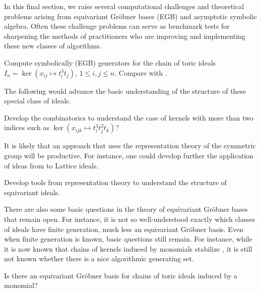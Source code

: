 
In this final section, we raise several computational challenges and theoretical problems arising from equivariant Gr\"obner bases (EGB) and asymptotic symbolic algebra.  Often these challenge problems can serve as benchmark tests for sharpening the methods of practitioners who are improving and implementing these new classes of algorithms.

\begin{problem}
Compute symbolically (EGB) generators for the chain of toric ideals $I_n = \ker(x_{ij} \mapsto t_i^3 t_j)$, $1 \leq i,j \leq n$.  Compare with \cite{Hillar13, hillar2016corrigendum, KKL:equivariant-markov, draisma2013noetherianity}.
\end{problem}

%

The following would advance the basic understanding of the structure of these special class of ideals.

\begin{problem}
Develop the combinatorics to understand the case of kernels with more than two indices such as $\ker(x_{ijk} \mapsto t_i^3 t_j^2 t_k)$?  
\end{problem}

It is likely that an approach that uses the representation theory of the symmetric group will be productive.  For instance, one could develop further the application of ideas from \cite{camina1991some} to Lattice ideals.

\begin{problem}
Develop tools from representation theory to understand the structure of equivariant ideals.
\end{problem}

There are also some basic questions in the theory of equivariant Gr\"obner bases that remain open.  For instance, it is not so well-understood exactly which classes of ideals have finite generation, much less an equivariant Gr\"obner basis.  Even when finite generation is known, basic questions still remain.  For instance, while it is now known that chains of kernels induced by monomials stabilize \cite{aschenbrenner2007finite, KKL:equivariant-markov, draisma2013noetherianity}, it is still not known whether there is a nice algorithmic generating set.

\begin{question}
Is there an equivariant Gr\"obner basis for chains of toric ideals induced by a monomial?
\end{question}

